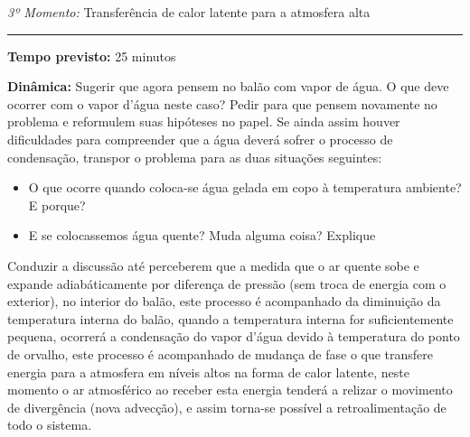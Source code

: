 \newpage
\vspace{50pt}
\noindent\emph{3º Momento:} Transferência de calor latente para a atmosfera alta
\par\noindent\rule{.3\textwidth}{.5pt}
\par\noindent\textbf{Tempo previsto:} 25 minutos
\par\noindent\textbf{Dinâmica:} Sugerir que agora pensem no balão com vapor de água. O que deve ocorrer com o vapor d'água neste caso? Pedir para que pensem novamente no problema e reformulem suas hipóteses no papel. Se ainda assim houver dificuldades para compreender que a água deverá sofrer o processo de condensação, transpor o problema para as duas situações seguintes:
\begin{itemize}
		\item O que ocorre quando coloca-se água gelada em copo à temperatura ambiente? E porque?
		\item E se colocassemos água quente? Muda alguma coisa? Explique
\end{itemize}



Conduzir a discussão até perceberem que a medida que o ar quente sobe e expande adiabáticamente por diferença de pressão (sem troca de energia com o exterior), no interior do balão, este processo é acompanhado da diminuição da temperatura interna do balão, quando a temperatura interna for suficientemente pequena, ocorrerá a condensação do vapor d'água devido à temperatura do ponto de orvalho, este processo é acompanhado de mudança de fase o que transfere energia para a atmosfera em níveis altos na forma de calor latente, neste momento o ar atmosférico ao receber esta energia tenderá a relizar o movimento de divergência (nova advecção), e assim torna-se possível a retroalimentação de todo o sistema. 

